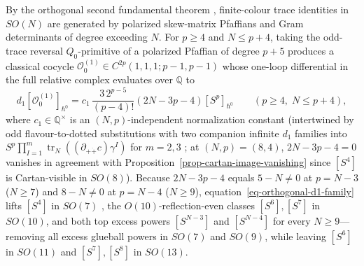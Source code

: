\documentclass[11pt]{article}
\numberwithin{equation}{section}
\numberwithin{figure}{section}
\numberwithin{table}{section}
\begin{document}
By the orthogonal second fundamental theorem \cite{GoodmanWallach,LehrerZhang}, finite-colour trace identities in $SO(N)$ are generated by polarized skew-matrix Pfaffians and Gram determinants of degree exceeding $N$. For $p\ge4$ and $N\le p+4$, taking the odd-trace reversal $Q_0$-primitive of a polarized Pfaffian of degree $p+5$ produces a classical cocycle $\mathcal O_0^{(1)}\in C^{2p}(1,1,1;p-1,p-1)$ whose one-loop differential in the full relative complex evaluates over $\mathbb Q$ to \cite{Repo}
\begin{equation}\label{eq-orthogonal-d1-family}
d_1[\mathcal O_0^{(1)}]_{\hbar^0}
=c_1\,\frac{3\,2^{p-5}}{(p-4)!}(2N-3p-4)[S^p]_{\hbar^0}
\qquad(p\ge4,\;N\le p+4),
\end{equation}
where $c_1\in\mathbb Q^\times$ is an $(N,p)$-independent normalization constant (intertwined by odd flavour-to-dotted substitutions with two companion infinite $d_1$ families into $S^p\prod_{I=1}^m\operatorname{tr}_N((\partial_{+\dot+}c)\gamma^I)$ for $m=2,3$ \cite{Repo}; at $(N,p)=(8,4)$, $2N-3p-4=0$ vanishes in agreement with Proposition~\ref{prop-cartan-image-vanishing} since $[S^4]$ is Cartan-visible in $SO(8)$). Because $2N-3p-4$ equals $5-N\ne0$ at $p=N-3$ ($N\ge7$) and $8-N\ne0$ at $p=N-4$ ($N\ge9$), equation~\eqref{eq-orthogonal-d1-family} lifts $[S^4]$ in $SO(7)$ \cite{KvLM}, the $O(10)$-reflection-even classes $[S^6],[S^7]$ in $SO(10)$, and both top excess powers $[S^{N-3}]$ and $[S^{N-4}]$ for every $N\ge9$---removing all excess glueball powers in $SO(7)$ and $SO(9)$, while leaving $[S^6]$ in $SO(11)$ and $[S^7],[S^8]$ in $SO(13)$.
\end{document}
